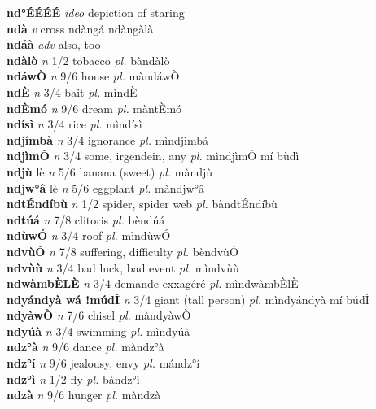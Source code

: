 \documentclass{article}
\begin{document}
{\bf nd°ÉÉÉÉ}  {\it ideo} depiction of staring         \\ 
{\bf ndà}  {\it v} cross   ndàngá   ndàngàlà   \\ 
{\bf ndáà}  {\it adv} also, too         \\ 
{\bf ndàlò}  {\it n} 1/2 tobacco {\it pl.} bàndàlò         \\ 
{\bf ndáwÒ}  {\it n} 9/6 house {\it pl.} màndáwÒ         \\ 
{\bf ndÈ}  {\it n} 3/4 bait {\it pl.} mìndÈ         \\ 
{\bf ndÈmó}  {\it n} 9/6 dream {\it pl.} màntÈmó         \\ 
{\bf ndísì}  {\it n} 3/4 rice {\it pl.} mìndísì         \\ 
{\bf ndjímbà}  {\it n} 3/4 ignorance {\it pl.} mìndjìmbá         \\ 
{\bf ndjìmÒ}  {\it n} 3/4 some, irgendein, any {\it pl.} mìndjìmÒ mí bùdì         \\ 
{\bf ndjù} lè {\it n} 5/6 banana (sweet) {\it pl.} màndjù         \\ 
{\bf ndjw°â} lè {\it n} 5/6 eggplant {\it pl.} màndjw°â         \\ 
{\bf ndtÉndíbù}  {\it n} 1/2 spider, spider web {\it pl.} bàndtÉndíbù         \\ 
{\bf ndtúá}  {\it n} 7/8 clitoris {\it pl.} bèndúá         \\ 
{\bf ndùwÓ}  {\it n} 3/4 roof {\it pl.} mìndùwÓ         \\ 
{\bf ndvùÓ}  {\it n} 7/8 suffering, difficulty {\it pl.} bèndvùÓ         \\ 
{\bf ndvùù}  {\it n} 3/4 bad luck, bad event {\it pl.} mìndvùù         \\ 
{\bf ndwàmbÈLÈ}  {\it n} 3/4 demande exxagéré {\it pl.} mìndwàmbÈlÈ         \\ 
{\bf ndyándyà wá !múdÌ}  {\it n} 3/4 giant (tall person) {\it pl.} mìndyándyà mí búdÌ         \\ 
{\bf ndyàwÒ}  {\it n} 7/6 chisel {\it pl.} màndyàwÒ         \\ 
{\bf ndyúà}  {\it n} 3/4 swimming {\it pl.} mìndyúà         \\ 
{\bf ndz°à}  {\it n} 9/6 dance {\it pl.} màndz°à         \\ 
{\bf ndz°í}  {\it n} 9/6 jealousy, envy {\it pl.} mándz°í         \\ 
{\bf ndz°ì}  {\it n} 1/2 fly {\it pl.} bàndz°ì         \\ 
{\bf ndzà}  {\it n} 9/6 hunger {\it pl.} màndzà         \\ 
\end{document}
